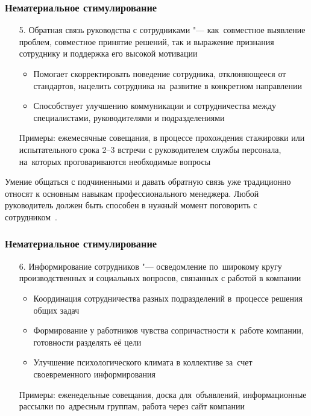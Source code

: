 \documentclass{../industrial-development}
\begin{document}
\begin{frame} \frametitle{Нематериальное стимулирование}

  \begin{itemize}
	
			\item[5.] \alert{Обратная связь руководства с сотрудниками} "--- как~совместное выявление проблем, совместное принятие решений, так и выражение признания сотруднику и поддержка его высокой мотивации
		  \begin{itemize}
		\item Помогает скорректировать поведение сотрудника, отклоняющееся от стандартов, нацелить сотрудника на~развитие в конкретном направлении
	\item Способствует улучшению коммуникации и сотрудничества между специалистами, руководителями и подразделениями

				\end{itemize}
Примеры: ежемесячные совещания, в процессе прохождения стажировки или испытательного срока 2--3 встречи с руководителем службы персонала, на~которых проговариваются необходимые вопросы
	  \end{itemize}

\end{frame}

\lecturenotes

Умение общаться с подчиненными и давать  обратную связь уже традиционно относят  к основным навыкам профессионального менеджера.  Любой руководитель должен быть способен в нужный момент поговорить с сотрудником~\cite{VchemosobenIT}.

\begin{frame} \frametitle{Нематериальное стимулирование}

  \begin{itemize}
	\item[6.] \alert{Информирование сотрудников} "--- осведомление по~широкому кругу производственных и социальных вопросов, связанных с работой в компании
	 \begin{itemize}
		\item Координация сотрудничества разных подразделений в~процессе решения общих задач
	\item Формирование у работников чувства сопричастности к~работе компании, готовности разделять её цели
	\item Улучшение психологического климата в коллективе за~счет своевременного информирования
  
		\end{itemize}
	 Примеры: еженедельные совещания, доска для~объявлений, информационные рассылки по~адресным группам, работа через сайт компании
	  \end{itemize}
		\end{frame}
		
\end{document}
